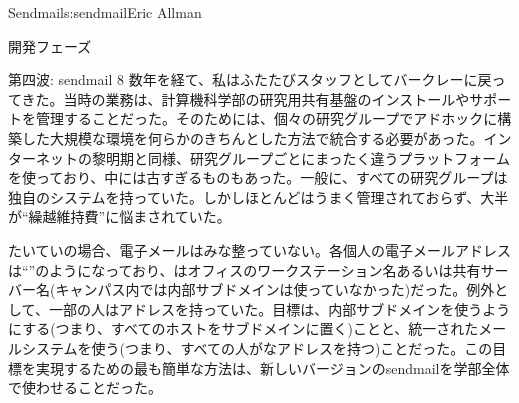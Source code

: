 \begin{aosachapter}{Sendmail}{s:sendmail}{Eric Allman}
\begin{aosasect1}{開発フェーズ}
\begin{aosasect2}{第四波: sendmail 8}
数年を経て、私はふたたびスタッフとしてバークレーに戻ってきた。当時の業務は、計算機科学部の研究用共有基盤のインストールやサポートを管理することだった。そのためには、個々の研究グループでアドホックに構築した大規模な環境を何らかのきちんとした方法で統合する必要があった。インターネットの黎明期と同様、研究グループごとにまったく違うプラットフォームを使っており、中には古すぎるものもあった。一般に、すべての研究グループは独自のシステムを持っていた。しかしほとんどはうまく管理されておらず、大半が``繰越維持費''に悩まされていた。

たいていの場合、電子メールはみな整っていない。各個人の電子メールアドレスは``''のようになっており、はオフィスのワークステーション名あるいは共有サーバー名(キャンパス内では内部サブドメインは使っていなかった)だった。例外として、一部の人はアドレスを持っていた。目標は、内部サブドメインを使うようにする(つまり、すべてのホストをサブドメインに置く)ことと、統一されたメールシステムを使う(つまり、すべての人がなアドレスを持つ)ことだった。この目標を実現するための最も簡単な方法は、新しいバージョンのsendmailを学部全体で使わせることだった。


\end{aosasect2}
\end{aosasect1}
\end{aosachapter}
